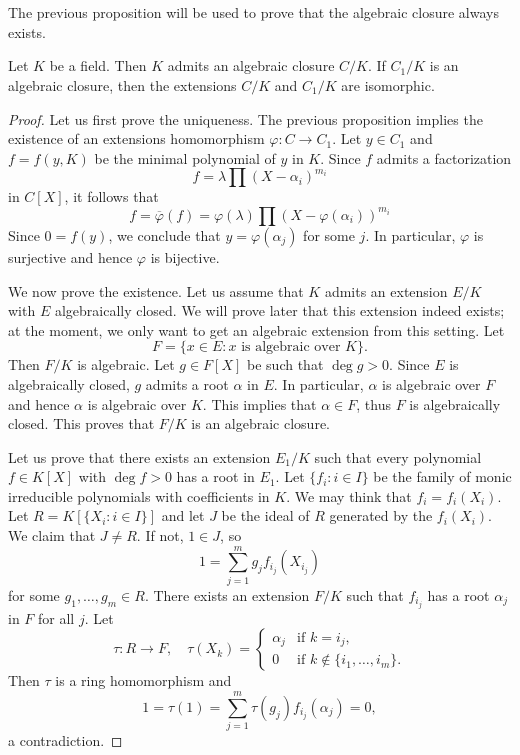 \chapter{}

The previous proposition will be used to prove 
that the algebraic closure always exists. 

\begin{theorem}[Artin]
	Let $K$ be a field. Then $K$ admits an algebraic closure $C/K$. If $C_1/K$
	is an algebraic closure, then the extensions $C/K$ and $C_1/K$ are
	isomorphic. 
\end{theorem}

\begin{proof}
    Let us first prove the uniqueness. The previous proposition implies the existence of 
    an extensions homomorphism $\varphi\colon C\to C_1$. Let $y\in C_1$ and $f=f(y,K)$ be 
    the minimal polynomial of $y$ in $K$. Since $f$ admits a factorization
    \[
        f=\lambda\prod (X-\alpha_i)^{m_i}
    \]
    in $C[X]$, it follows that
    \[
    f=\overline{\varphi}(f)=\varphi(\lambda)\prod (X-\varphi(\alpha_i))^{m_i}
    \]
    Since $0=f(y)$, we conclude that $y=\varphi(\alpha_j)$ for some $j$. In particular, $\varphi$ is
    surjective and hence $\varphi$ is bijective. 
    
    We now prove the existence. Let us assume that $K$ admits an extension $E/K$ 
    with $E$ algebraically closed. We will prove later that this extension indeed exists; at the moment,
    we only want to get an algebraic extension from this setting. Let 
    \[
    	F=\{x\in E:x\text{ is algebraic over }K\}. 
    \]
    Then $F/K$ is algebraic. Let $g\in F[X]$ be such that
    $\deg g>0$. Since $E$ is algebraically closed, $g$ admits a root $\alpha$ in $E$. In particular, $\alpha$
    is algebraic over $F$ and hence $\alpha$ is algebraic over $K$. This implies that $\alpha\in F$, thus
    $F$ is algebraically closed. This proves that $F/K$ is an algebraic closure. 
    
    Let us prove that there exists an extension $E_1/K$ such that
    every polynomial $f\in K[X]$ with $\deg f>0$ has a root in $E_1$. Let 
    $\{f_i:i\in I\}$ be the family of monic irreducible polynomials with coefficients in $K$. 
    We may think that $f_i=f_i(X_i)$. 
    Let $R=K[\{X_i:i\in I\}]$ and let $J$ be the ideal of $R$ 
    generated by the $f_i(X_i)$. We claim that $J\ne R$. If not, $1\in J$, so
    \[
    1=\sum_{j=1}^m g_jf_{i_j}(X_{i_j})
    \]
    for some $g_1,\dots,g_m\in R$. There exists an extension $F/K$ such that
    $f_{i_j}$ has a root $\alpha_j$ in $F$ for all $j$. Let 
    \[
    \tau\colon R\to F,\quad
    \tau(X_k)=\begin{cases}
        \alpha_j & \text{if $k=i_j$},\\
        0 & \text{if $k\not\in\{i_1,\dots,i_m\}$}.
        \end{cases}
    \]
    Then $\tau$ is a ring homomorphism and 
    \[
    1=\tau(1)=\sum_{j=1}^m\tau(g_j)f_{i_j}(\alpha_{j})=0,
    \]
    a contradiction. 
    

\end{proof}
